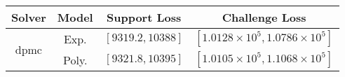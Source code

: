 \begin{tabular}{cc|c|c} 
\hline 
 Solver & Model & Support Loss  & Challenge Loss \tabularnewline\hline 
\hline 
\multirow{2}{*}{dpmc} & Exp. & $\left[9319.2,10388\right]$ & $\left[1.0128\times10^{5},1.0786\times10^{5}\right]$ \tabularnewline 
 & Poly. & $\left[9321.8,10395\right]$ & $\left[1.0105\times10^{5},1.1068\times10^{5}\right]$ \tabularnewline 
\hline 
\end{tabular} 

